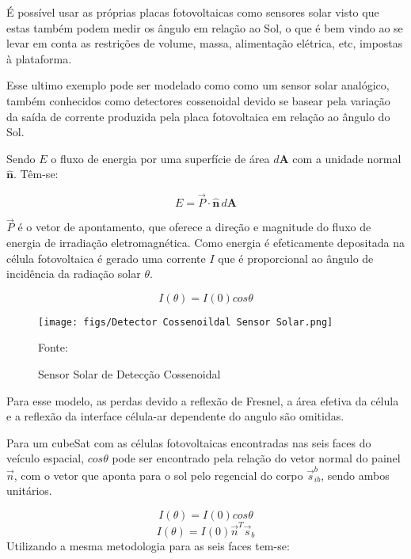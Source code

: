 É possível usar as próprias placas fotovoltaicas como sensores solar visto que estas também podem medir os ângulo em relação ao Sol, o que é bem vindo ao se  levar em conta as restrições de volume, massa, alimentação elétrica, etc, impostas à plataforma\cite{baroni2020attitude}.

Esse ultimo exemplo pode ser modelado como como um sensor solar analógico, também conhecidos como detectores cossenoidal devido se basear pela variação da saída de corrente produzida pela placa fotovoltaica em relação ao ângulo do Sol.

Sendo $E$ o fluxo de energia por uma superfície de área $d\mathbf{A}$ com a unidade normal $\hat{\mathbf{n}}$. Têm-se:

\begin{equation}
E=\vec{P} \cdot \hat{\mathbf{n}}\, d\mathbf{A}
\end{equation}

$\vec{P}$ é o vetor de apontamento, que oferece a direção e magnitude do fluxo de energia de irradiação eletromagnética. Como energia é efeticamente depositada na célula fotovoltaica é gerado uma corrente $I$ que é proporcional ao ângulo de incidência da radiação solar $\theta$.

\begin{equation}
I\left (  \theta \right ) = I\left ( 0 \right )cos\theta
\end{equation}

\begin{figure}[htpb]
\centering
\texttt{[image: figs/Detector Cossenoildal Sensor Solar.png]}
\caption{Sensor Solar de Detecção Cossenoidal}
{Fonte: \cite[p.~156]{wertz2012spacecraft}}
\label{fig:4}
\end{figure}

Para esse modelo, as perdas devido a reflexão de Fresnel, a área efetiva da célula e a reflexão da interface célula-ar dependente do angulo são omitidas.

Para um cubeSat com as células fotovoltaicas encontradas nas seis faces do veículo espacial,  $cos\theta$ pode ser encontrado pela relação do vetor normal do painel $\vec{n}$, com o vetor que aponta para o sol pelo regencial do corpo $\vec{s}^b_{ib}$, sendo ambos unitários.

\begin{equation}
I(\theta)=I(0)cos\theta
\end{equation}
\begin{equation}
I(\theta)=I(0)\vec{n}^T \vec{s}_b
\end{equation}
Utilizando a mesma metodologia para as seis faces tem-se:

